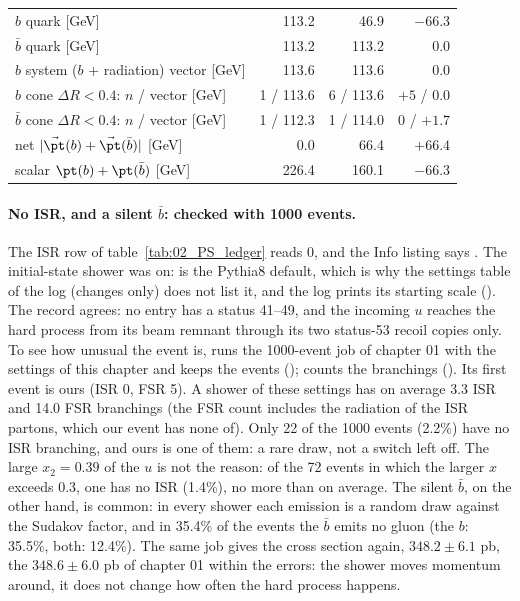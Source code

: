 \begin{table}[htbp]
\begin{tabular}{lrrr}
\midrule
$b$ quark \pt{} [GeV] & 113.2 & 46.9 & $-66.3$ \\
$\bar b$ quark \pt{} [GeV] & 113.2 & 113.2 & 0.0 \\
$b$ system ($b$ + radiation) vector \pt{} [GeV] & 113.6 & 113.6 & 0.0 \\
$b$ cone $\Delta R < 0.4$: $n$ / vector \pt{} [GeV] & 1 / 113.6 & 6 / 113.6 & $+5$ / 0.0 \\
$\bar b$ cone $\Delta R < 0.4$: $n$ / vector \pt{} [GeV] & 1 / 112.3 & 1 / 114.0 & 0 / $+1.7$ \\
net $|\vec\pt(b) + \vec\pt(\bar b)|$ [GeV] & 0.0 & 66.4 & $+66.4$ \\
scalar $\pt(b) + \pt(\bar b)$ [GeV] & 226.4 & 160.1 & $-66.3$ \\
\bottomrule
\end{tabular}
\end{table}

\paragraph{No ISR, and a silent $\bar b$: checked with 1000 events.} The ISR row of table~\ref{tab:02_PS_ledger}
reads 0, and the Info listing says . The initial-state shower was on:  is
the Pythia8 default, which is why the settings table of the log (changes only) does not list it, and the log prints
its starting scale (). The record agrees: no entry has a status 41--49, and the
incoming $u$ reaches the hard process from its beam remnant through its two status-53 recoil copies only. To see how
unusual the event is,  runs the 1000-event job of chapter 01 with the settings of this chapter and
keeps the events ();  counts the branchings
(). Its first event is ours (ISR 0, FSR 5). A shower of these settings has on average
3.3 ISR and 14.0 FSR branchings (the FSR count includes the radiation of the ISR partons, which our event has none
of). Only 22 of the 1000 events (2.2\%) have no ISR branching, and ours is one of them: a rare draw, not a switch left
off. The large $x_2 = 0.39$ of the $u$ is not the reason: of the 72 events in which the larger $x$ exceeds 0.3, one
has no ISR (1.4\%), no more than on average. The silent $\bar b$, on the other hand, is common: in every shower each
emission is a random draw against the Sudakov factor, and in 35.4\% of the events the $\bar b$ emits no gluon (the
$b$: 35.5\%, both: 12.4\%). The same job gives the cross section again, $348.2\pm6.1$ pb, the $348.6\pm6.0$ pb of
chapter 01 within the errors: the shower moves momentum around, it does not change how often the hard process happens.

